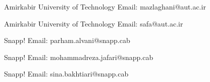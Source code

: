 
\begin{cventries}

{Amirkabir University of Technology}
{Email: mazlaghani@aut.ac.ir}{}

{Amirkabir University of Technology}
{Email: safa@aut.ac.ir}{}

\end{cventries}


\begin{cventries}

{Snapp!}
{Email: parham.alvani@snapp.cab}{}

{Snapp!}
{Email: mohammadreza.jafari@snapp.cab}{}

{Snapp!}
{Email: sina.bakhtiari@snapp.cab}{}

\end{cventries}
